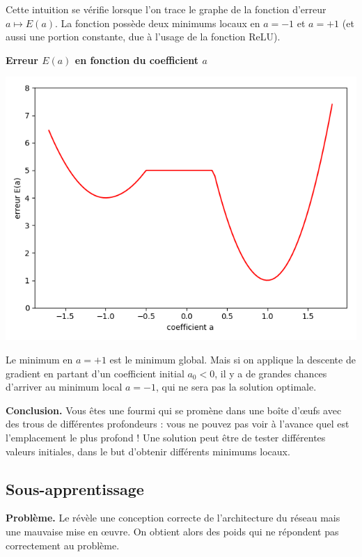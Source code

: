 \documentclass[11pt,class=report,crop=false]{standalone}
\begin{document}
Cette intuition se vérifie lorsque l'on trace le graphe de la fonction d'erreur $a \mapsto E(a)$. La fonction possède deux minimums locaux en $a=-1$ et $a=+1$ (et aussi une portion constante, due à l'usage de la fonction ReLU).
\begin{center}
\textbf{Erreur $E(a)$ en fonction du coefficient $a$}

\includegraphics[scale=\myscale,scale=0.45]{figures/retro_04_e}
\end{center}
Le minimum en $a=+1$ est le minimum global. Mais si on applique la descente de gradient en partant d'un coefficient initial $a_0<0$, il y a de grandes chances d'arriver au minimum local $a=-1$, qui ne sera pas la solution optimale.

\bigskip

\textbf{Conclusion.} Vous êtes une fourmi qui se promène dans une boîte d'\oe ufs avec des trous de différentes profondeurs : vous ne pouvez pas voir à l'avance quel est l'emplacement le plus profond ! Une solution peut être de tester différentes valeurs initiales, dans le but d'obtenir différents minimums locaux.

\subsection{Sous-apprentissage}

\textbf{Problème.}
Le  révèle une conception correcte de l'architecture du réseau mais une mauvaise mise en \oe uvre. On obtient alors des poids qui ne répondent pas correctement au problème.
\end{document}
